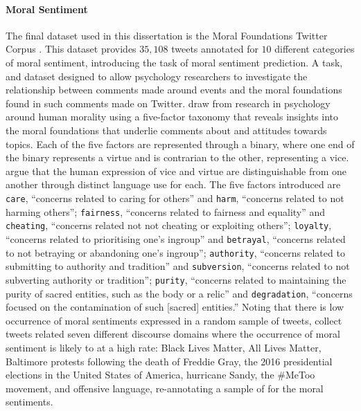 \paragraph*{Moral Sentiment} The final dataset used in this dissertation is the Moral Foundations Twitter Corpus \citep{Hoover:2019}. This dataset provides $35,108$ tweets annotated for $10$ different categories of moral sentiment, introducing the task of moral sentiment prediction.
A task, and dataset designed to allow psychology researchers to investigate the relationship between comments made around events and the moral foundations found in such comments made on Twitter.
\citet{Hoover:2019} draw from research in psychology around human morality using a five-factor taxonomy that reveals insights into the moral foundations that underlie comments about and attitudes towards topics.
Each of the five factors are represented through a binary, where one end of the binary represents a virtue and is contrarian to the other, representing a vice.
\citet{Hoover:2019} argue that the human expression of vice and virtue are distinguishable from one another through distinct language use for each.
The five factors introduced are \texttt{care}, ``concerns related to caring for others'' and \texttt{harm}, ``concerns related to not harming others''; \texttt{fairness}, ``concerns related to fairness and equality'' and \texttt{cheating}, ``concerns related not not cheating or exploiting others''; \texttt{loyalty}, ``concerns related to prioritising one's ingroup'' and \texttt{betrayal}, ``concerns related to not betraying or abandoning one's ingroup''; \texttt{authority}, ``concerns related to submitting to authority and tradition'' and \texttt{subversion}, ``concerns related to not subverting authority or tradition''; \texttt{purity}, ``concerns related to maintaining the purity of sacred entities, such as the body or a relic'' and \texttt{degradation}, ``concerns focused on the contamination of such [sacred] entities.''
Noting that there is low occurrence of moral sentiments expressed in a random sample of tweets, \citet{Hoover:2019} collect tweets related seven different discourse domains where the occurrence of moral sentiment is likely to at a high rate: Black Lives Matter, All Lives Matter, Baltimore protests following the death of Freddie Gray, the 2016 presidential elections in the United States of America, hurricane Sandy, the \#MeToo movement, and offensive language, re-annotating a sample of \citet{Davidson:2017} for the moral sentiments.
